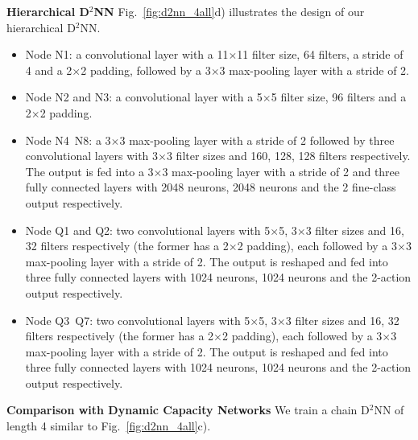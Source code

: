 \documentclass[10pt,twocolumn,letterpaper]{article}
\newcommand{\smallparagraph}[1]{\smallskip \noindent \textbf{#1}}
\begin{document}
\smallparagraph{Hierarchical D$^2$NN}
Fig.~\ref{fig:d2nn_4all}d) illustrates the design of our hierarchical D$^2$NN.

\begin{itemize}
\item Node N1: a convolutional layer with a 11$\times$11 filter size, 64 filters, a stride of 4 and a 2$\times$2 padding,
  followed by a 3$\times$3 max-pooling layer with a stride of 2.

\item Node N2 and N3: a convolutional layer with a 5$\times$5 filter size, 96 filters and a 2$\times$2 padding.
  
\item Node N4~N8: a 3$\times$3 max-pooling layer with a stride of 2 followed by three convolutional layers with 3$\times$3 filter sizes and
  160, 128, 128 filters respectively. The output is fed into a 3$\times$3 max-pooling layer with a stride of 2 and three fully connected layers
  with 2048 neurons, 2048 neurons and the 2 fine-class output respectively.
  
\item Node Q1 and Q2: two convolutional layers with 5$\times$5, 3$\times$3 filter sizes and 16, 32 filters respectively (the former has a 2$\times$2 padding), each
  followed by a 3$\times$3 max-pooling layer with a stride of 2.
  The output is reshaped and fed into three fully connected layers with 1024 neurons, 1024 neurons and the 2-action output respectively.

\item Node Q3~Q7: two convolutional layers with 5$\times$5, 3$\times$3 filter sizes and 16, 32 filters respectively (the former has a 2$\times$2 padding), each
  followed by a 3$\times$3 max-pooling layer with a stride of 2.
  The output is reshaped and fed into three fully connected layers with 1024 neurons, 1024 neurons and the 2-action output respectively.
\end{itemize}



\smallparagraph{Comparison with Dynamic Capacity Networks}
We train a chain D$^2$NN of length
4 similar to Fig.~\ref{fig:d2nn_4all}c).
\end{document}
